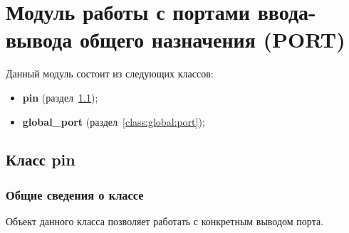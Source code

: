 \chapter{Модуль работы с портами ввода-вывода общего назначения (PORT)}\label{port:0}
Данный модуль состоит из следующих классов:
\begin{itemize}
	\item \textbf{pin} (раздел~\ref{class:pin});
	\item \textbf{global\_port} (раздел~\ref{class:global:port});
\end{itemize}

\section{Класс pin}\label{class:pin}
\subsection{Общие сведения о классе}
Объект данного класса позволяет работать с конкретным выводом порта.

